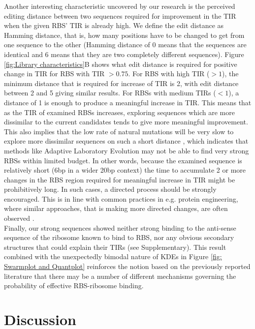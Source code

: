 \documentclass{article}
\begin{document}
Another interesting characteristic uncovered by our research is the perceived editing distance between two sequences required for  improvement in the TIR when the given RBS' TIR is already high. 
We define the edit distance as Hamming distance, that is, how many positions have to be changed to get from one sequence to the other (Hamming distance of 0 means that the sequences are identical and 6 means that they are two completely different sequences).
Figure \ref{fig:Library characteristics}B shows what edit distance is required for positive change in TIR for RBS with TIR $>0.75$.
For RBS with high TIR ($>1$), the minimum distance that is required for increase of TIR is 2, with edit distance between 2 and 5 giving similar results.
For RBSs with medium TIRs ($<1$), a distance of 1 is enough to produce a meaningful increase in TIR.
This means that as the TIR of examined RBSs increases, exploring sequences which are more dissimilar to the current candidates tends to give more meaningful improvement. 
This also implies that the low rate of natural mutations will be very slow to explore more dissimilar sequences on such a short distance \cite{Lee2012}, which indicates that methods like Adaptive Laboratory Evolution may not be able to find very strong RBSs within limited budget.  
In other words, because the examined sequence is relatively short (6bp in a wider 20bp context) the time to accumulate 2 or more changes in the RBS region required for meaningful increase in TIR might be prohibitively long.
In such cases, a directed process should be strongly encouraged.
This is in line with common practices in e.g. protein engineering, where similar approaches, that is making more directed changes, are often observed \cite{Jackel2008}.\\

Finally, our strong sequences showed neither strong binding to the anti-sense sequence of the ribosome known to bind to RBS, nor any obvious secondary structures that could explain their TIRs (see Supplementary).
This result combined with the unexpectedly bimodal nature of KDEs in Figure \ref{fig: Swarmplot and Quantplot} reinforces the notion based on the previously reported literature \cite{Saito2020,EspahBorujeni2016} that there may be a number of different mechanisms governing the probability of effective RBS-ribosome binding.\\


\section{Discussion}
\end{document}

